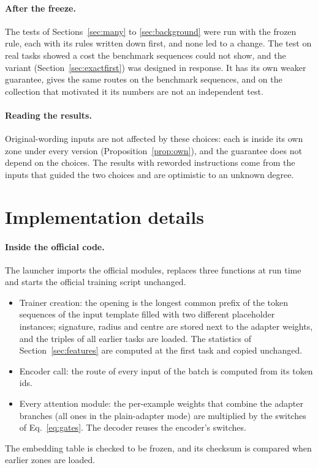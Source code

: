 \paragraph{After the freeze.} The tests of Sections~\ref{sec:many} to \ref{sec:background} were run with the frozen rule, each with its rules written down first, and none led to a change. The test on \ManyTasks{} real tasks showed a cost the benchmark sequences could not show, and the variant \exactfirst{} (Section~\ref{sec:exactfirst}) was designed in response. It has its own weaker guarantee, gives the same routes on the benchmark sequences, and on the collection that motivated it its numbers are not an independent test.

\paragraph{Reading the results.} Original-wording inputs are not affected by these choices: each is inside its own zone under every version (Proposition~\ref{prop:own}), and the guarantee does not depend on the choices. The results with reworded instructions come from the inputs that guided the two choices and are optimistic to an unknown degree.

\FloatBarrier
\section{Implementation details}
\label{app:impl}

\paragraph{Inside the official code.} The launcher imports the official modules, replaces three functions at run time and starts the official training script unchanged.
\begin{itemize}
  \item Trainer creation: the opening is the longest common prefix of the token sequences of the input template filled with two different placeholder instances; signature, radius and centre are stored next to the adapter weights, and the triples of all earlier tasks are loaded. The statistics of Section~\ref{sec:features} are computed at the first task and copied unchanged.
  \item Encoder call: the route of every input of the batch is computed from its token ids.
  \item Every attention module: the per-example weights that combine the adapter branches (all ones in the plain-adapter mode) are multiplied by the switches of Eq.~\eqref{eq:gates}. The decoder reuses the encoder's switches.
\end{itemize}
The embedding table is checked to be frozen, and its checksum is compared when earlier zones are loaded.

